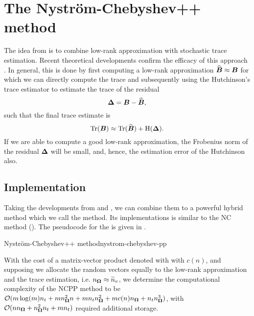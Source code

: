 \chapter{The Nystr\"om-Chebyshev++ method}
\label{chp:4-nystromchebyshev}

The idea from \cite{lin2017randomized} is to combine low-rank approximation
with stochastic trace estimation. Recent theoretical developments confirm the
efficacy of this approach \cite{meyer2021hutch,persson2022hutch}. In general,
this is done by first computing a low-rank approximation $\widehat{\boldsymbol{B}} \approx \boldsymbol{B}$
for which we can directly compute the trace and subsequently using the
Hutchinson's trace estimator 
to estimate the trace of the residual
\begin{equation}
    \boldsymbol{\Delta} = \boldsymbol{B} - \widehat{\boldsymbol{B}},
    \label{equ:4-nystromchebyshev-residual}
\end{equation}
such that the final trace estimate is
\begin{equation}
    \operatorname{Tr}(\boldsymbol{B}) \approx \operatorname{Tr}(\widehat{\boldsymbol{B}}) + \operatorname{H}(\boldsymbol{\Delta}).
    \label{equ:4-nystromchebyshev-hutch-pp}
\end{equation}
If we are able to compute a good low-rank approximation, the Frobenius norm
of the residual $\boldsymbol{\Delta}$ will be small, and, hence, the estimation
error of the Hutchinson  also.


\section{Implementation}
\label{sec:4-nystromchebyshev-implementation}

Taking the developments from  and ,
we can combine them to a powerful hybrid method which we call the 
method. Its implementations is similar to the \gls{NC} method ().
The pseudocode for the  is given in .

\begin{algo}{Nystr\"om-Chebyshev++ method}{nystrom-chebyshev-pp}
    
\end{algo}

With the cost of a matrix-vector product denoted with
with $c(n)$, and supposing we allocate the random vectors equally
to the low-rank approximation and the trace estimation, i.e. $n_{\boldsymbol{\Omega}} \approx \widetilde{n}_v$,
we determine the computational complexity of the \gls{NCPP}
method to be $\mathcal{O}(m \log(m) n_t + m n_{\boldsymbol{\Omega}}^2 n + m n_t n_{\boldsymbol{\Omega}}^2 +  m c(n) n_{\boldsymbol{\Omega}} + n_t n_{\boldsymbol{\Omega}}^3)$, with
$\mathcal{O}(n n_{\boldsymbol{\Omega}} + n_{\boldsymbol{\Omega}}^2 n_t + m n_t)$ required additional storage.

